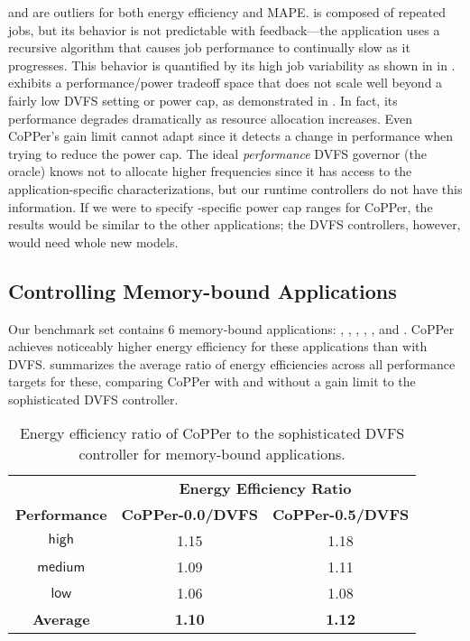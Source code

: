  and  are outliers for both energy efficiency and MAPE.
 is composed of repeated jobs, but its behavior is not predictable with feedback---the application uses a recursive algorithm that causes job performance to continually slow as it progresses.
This behavior is quantified by its high job variability as shown in  in .
 exhibits a performance/power tradeoff space that does not scale well beyond a fairly low DVFS setting or power cap, as demonstrated in .
In fact, its performance degrades dramatically as resource allocation increases.
Even CoPPer's gain limit cannot adapt since it detects a change in performance when trying to reduce the power cap.
The ideal \emph{performance} DVFS governor (the oracle) knows not to allocate higher frequencies since it has access to the application-specific characterizations, but our runtime controllers do not have this information.
If we were to specify -specific power cap ranges for CoPPer, the results would be similar to the other applications; the DVFS controllers, however, would need whole new models.


\subsection{Controlling Memory-bound Applications}

Our benchmark set contains 6 memory-bound applications: , , , , , and .
CoPPer achieves noticeably higher energy efficiency for these applications than with DVFS.
 summarizes the average ratio of energy efficiencies across all performance targets for these, comparing CoPPer with and without a gain limit to the sophisticated DVFS controller.

\begin{table}[t]
\small
\centering
\caption{Energy efficiency ratio of CoPPer to the sophisticated DVFS controller for memory-bound applications.}
\begin{tabular}{ccc}
  &\multicolumn{2}{c}{\bf Energy Efficiency Ratio} \\
  \textbf{Performance} & \textbf{CoPPer-0.0/DVFS} & {\bf CoPPer-0.5/DVFS} \\
  \hline
  \hline
    $\mathsf{high}$  & 1.15  & 1.18 \\
   $\mathsf{medium}$   & 1.09  & 1.11 \\
   $\mathsf{low}$   & 1.06  & 1.08 \\
  \textbf{Average}& \textbf{1.10}  & \textbf{1.12} \\
  \hline
  \hline
\end{tabular}
\label{tbl:copper-mem}
\end{table}

